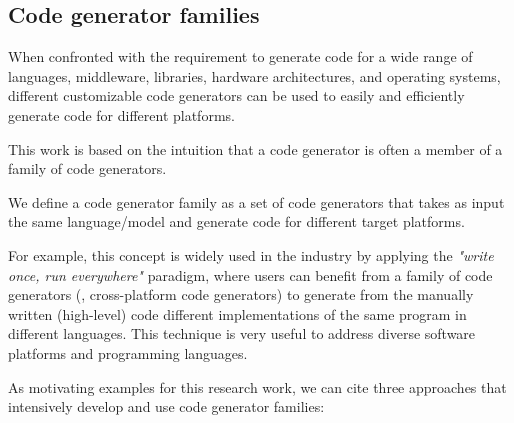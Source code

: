 \subsection{Code generator families}
When confronted with the requirement to generate code for a wide range of languages, middleware, libraries, hardware architectures, and operating systems, different customizable code generators can be used to easily and efficiently  generate code for different platforms.

This work is based on the intuition that a code generator is often a member of a family of code generators\cite{chae2008building}.

\begin{mydef}
	We define a code generator family as a set of code generators that takes as input the same language/model and generate code for different target platforms.
\end{mydef}

For example, this concept is widely used in the industry by applying the \textit{"write once, run everywhere"} paradigm, where users can benefit from a family of code generators (\eg, cross-platform code generators\cite{fumero2015runtime}) to generate from the manually written (high-level) code different implementations of the same program in different languages. This technique is very useful to address diverse software platforms and programming languages.

As motivating examples for this research work, we can cite three approaches that intensively develop and use code generator families: 
